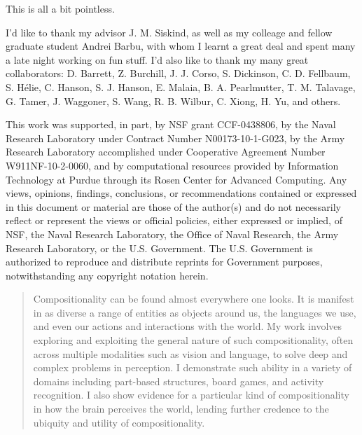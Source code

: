 \begin{dedication}
  This is all a bit pointless.
\end{dedication}

\begin{acknowledgments}
  I'd like to thank my advisor J. M. Siskind, as well as my colleage and fellow
  graduate student Andrei Barbu, with whom I learnt a great deal and spent
  many a late night working on fun stuff.
  I'd also like to thank my many great collaborators: D. Barrett, Z. Burchill,
  J. J. Corso, S. Dickinson, C. D. Fellbaum, S. H\'{e}lie, C. Hanson,
  S. J. Hanson, E. Malaia, B. A. Pearlmutter, T. M. Talavage, G. Tamer,
  J. Waggoner, S. Wang, R. B. Wilbur, C. Xiong, H. Yu, and others.  \vfill
  \begin{footnotesize}
    This work was supported, in part, by NSF grant CCF-0438806, by the Naval
    Research Laboratory under Contract Number N00173-10-1-G023, by the Army
    Research Laboratory accomplished under Cooperative Agreement Number
    W911NF-10-2-0060, and by computational resources provided by Information
    Technology at Purdue through its Rosen Center for Advanced Computing.
    Any views, opinions, findings, conclusions, or recommendations contained or
    expressed in this document or material are those of the author(s) and do not
    necessarily reflect or represent the views or official policies, either
    expressed or implied, of NSF, the Naval Research Laboratory, the Office of
    Naval Research, the Army Research Laboratory, or the U.S. Government.
    The U.S. Government is authorized to reproduce and distribute reprints for
    Government purposes, notwithstanding any copyright notation herein.
  \end{footnotesize}
\end{acknowledgments}

\tableofcontents

\listoftables

\listoffigures

\begin{abstract}
  Compositionality can be found almost everywhere one looks. It is manifest in as
  diverse a range of entities as objects around us, the languages we use, and
  even our actions and interactions with the world.
  My work involves exploring and exploiting the general nature of such
  compositionality, often across multiple modalities such as vision and
  language, to solve deep and complex problems in perception.
  I demonstrate such ability in a variety of domains including part-based
  structures, board games, and activity recognition.
  I also show evidence for a particular kind of compositionality in how the
  brain perceives the world, lending further credence to the ubiquity and
  utility of compositionality.
\end{abstract}
